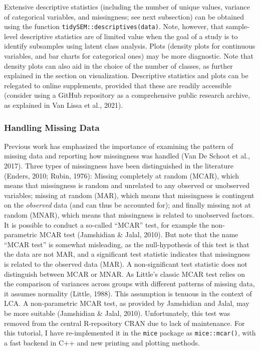 \documentclass[
  ,man,floatsintext]{apa6}
\begin{document}
Extensive descriptive statistics (including the number of unique values,
variance of categorical variables, and missingness; see next subsection)
can be obtained using the function \texttt{tidySEM::descriptives(data)}. Note,
however, that sample-level descriptive statistics are of limited value
when the goal of a study is to identify subsamples using latent class
analysis. Plots (density plots for continuous variables, and bar charts
for categorical ones) may be more diagnostic. Note that density plots
can also aid in the choice of the number of classes, as further
explained in the section on visualization. Descriptive statistics and
plots can be relegated to online supplements, provided that these are
readily accessible (consider using a GitHub repository as a
comprehensive public research archive, as explained in Van Lissa et al., 2021).

\hypertarget{handling-missing-data}{%
\subsubsection{Handling Missing Data}\label{handling-missing-data}}

Previous work has emphasized the importance of examining the pattern of
missing data and reporting how missingness was handled
(Van De Schoot et al., 2017). Three types of missingness have
been distinguished in the literature (Enders, 2010; Rubin, 1976): Missing
completely at random (MCAR), which means that missingness is random and unrelated to any observed or unobserved variables;
missing at random (MAR), which means that missingness is contingent on
the \emph{observed} data (and can thus be accounted for); and finally missing
not at random (MNAR), which means that missingness is related to
unobserved factors. It is possible to conduct a so-called ``MCAR'' test,
for example the non-parametric MCAR test (Jamshidian \& Jalal, 2010). But
note that the name ``MCAR test'' is somewhat misleading, as the
null-hypothesis of this test is that the data are not MAR, and a
significant test statistic indicates that missingness is related to the
observed data (MAR). A non-significant test statistic does not
distinguish between MCAR or MNAR. As Little's classic MCAR test relies
on the comparison of variances across groups with different patterns of
missing data, it assumes normality (Little, 1988). This assumption
is tenuous in the context of LCA. A non-parametric MCAR test, as
provided by Jamshidian and Jalal, may be more suitable
(Jamshidian \& Jalal, 2010). Unfortunately, this test was removed from the
central R-repository CRAN due to lack of maintenance. For this tutorial,
I have re-implemented it in the \texttt{mice} package as \texttt{mice::mcar()}, with a
fast backend in C++ and new printing and plotting methods.
\end{document}
